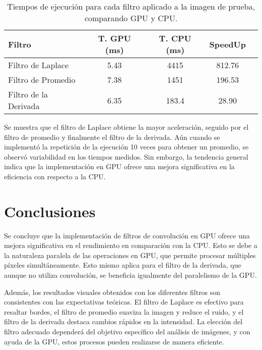 \documentclass{pas}
\begin{document}
\begin{table}[H]
    \centering
    \caption{Tiempos de ejecución para cada filtro aplicado a la imagen de prueba, comparando GPU y CPU.}
    \label{tab:performance}
    \begin{tabular}{lcccc}
        \hline
        \textbf{Filtro} & \textbf{T. GPU (ms)} & \textbf{T. CPU (ms)} & \textbf{SpeedUp} \\
        \hline
        Filtro de Laplace & 5.43 & 4415 & 812.76 \\
        Filtro de Promedio & 7.38 & 1451 & 196.53 \\
        Filtro de la Derivada & 6.35 & 183.4 & 28.90 \\
        \hline
    \end{tabular}
\end{table}

\noindent Se muestra que el filtro de Laplace obtiene la mayor aceleración, seguido por el filtro de promedio y finalmente el filtro de la derivada. Aún cuando se implementó la repetición de la ejecución 10 veces para obtener un promedio, se observó variabilidad en los tiempos medidos. Sin embargo, la tendencia general indica que la implementación en GPU ofrece una mejora significativa en la eficiencia con respecto a la CPU.

\section{Conclusiones}

Se concluye que la implementación de filtros de convolución en GPU ofrece una mejora significativa en el rendimiento en comparación con la CPU. Esto se debe a la naturaleza paralela de las operaciones en GPU, que permite procesar múltiples píxeles simultáneamente. Esto mismo aplica para el filtro de la derivada, que aunque no utiliza convolución, se beneficia igualmente del paralelismo de la GPU. 

Además, los resultados visuales obtenidos con los diferentes filtros son consistentes con las expectativas teóricas. El filtro de Laplace es efectivo para resaltar bordes, el filtro de promedio suaviza la imagen y reduce el ruido, y el filtro de la derivada destaca cambios rápidos en la intensidad. La elección del filtro adecuado dependerá del objetivo específico del análisis de imágenes, y con ayuda de la GPU, estos procesos pueden realizarse de manera eficiente.




\end{document}
